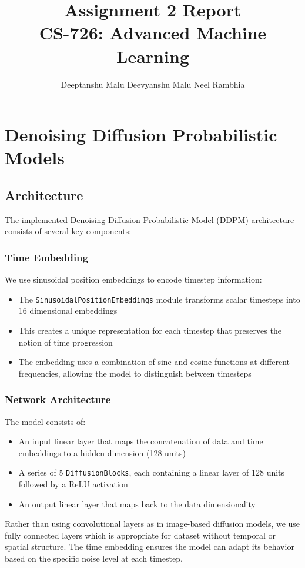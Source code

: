 \documentclass[11pt]{article}
\title{Assignment 2 Report\\
    CS-726: Advanced Machine Learning}
\author{Deeptanshu Malu \quad Deevyanshu Malu \quad Neel Rambhia}
\date{}
\begin{document}
\maketitle

\section{Denoising Diffusion Probabilistic Models}

\subsection{Architecture}

The implemented Denoising Diffusion Probabilistic Model (DDPM) architecture consists of several key components:

\subsubsection{Time Embedding}
We use sinusoidal position embeddings to encode timestep information:
\begin{itemize}
    \item The \texttt{SinusoidalPositionEmbeddings} module transforms scalar timesteps into 16 dimensional embeddings
    \item This creates a unique representation for each timestep that preserves the notion of time progression
    \item The embedding uses a combination of sine and cosine functions at different frequencies, allowing the model to distinguish between timesteps
\end{itemize}

\subsubsection{Network Architecture}
The model consists of:
\begin{itemize}
    \item An input linear layer that maps the concatenation of data and time embeddings to a hidden dimension (128 units)
    \item A series of 5 \texttt{DiffusionBlocks}, each containing a linear layer of 128 units followed by a ReLU activation
    \item An output linear layer that maps back to the data dimensionality
\end{itemize}

Rather than using convolutional layers as in image-based diffusion models, we use fully connected layers which is appropriate for dataset without temporal or spatial structure. The time embedding ensures the model can adapt its behavior based on the specific noise level at each timestep.
\end{document}
